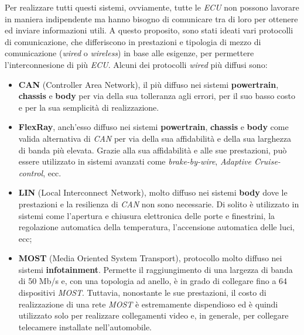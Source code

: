 Per realizzare tutti questi sistemi, ovviamente, tutte le \emph{ECU} non possono lavorare in maniera indipendente ma hanno bisogno di comunicare tra di loro per ottenere ed inviare informazioni utili. A questo proposito, sono stati ideati vari protocolli di comunicazione, che differiscono in prestazioni e tipologia di mezzo di comunicazione (\emph{wired} o \emph{wireless}) in base alle esigenze, per permettere l'interconnesione di più \emph{ECU}. Alcuni dei protocolli \emph{wired} più diffusi sono:
\begin{itemize}
    \item \textbf{CAN} (Controller Area Network), il più diffuso nei sistemi \textbf{powertrain}, \textbf{chassis} e \textbf{body} per via della sua tolleranza agli errori, per il suo basso costo e per la sua semplicità di realizzazione.
    \item \textbf{FlexRay}, anch'esso diffuso nei sistemi \textbf{powertrain}, \textbf{chassis} e \textbf{body} come valida alternativa di \emph{CAN} per via della sua affidabilità e della sua larghezza di banda più elevata. Grazie alla sua affidabilità e alle sue prestazioni, può essere utilizzato in sistemi avanzati come \emph{brake-by-wire}, \emph{Adaptive Cruise-control}, ecc. 
    \item \textbf{LIN} (Local Interconnect Network), molto diffuso nei sistemi \textbf{body} dove le prestazioni e la resilienza di \emph{CAN} non sono necessarie. Di solito è utilizzato in sistemi come l'apertura e chiusura elettronica delle porte e finestrini, la regolazione automatica della temperatura, l'accensione automatica delle luci, ecc; \cite{vinodhkumar_2014_automotive}
    \item \textbf{MOST} (Media Oriented System Transport), protocollo molto diffuso nei sistemi \textbf{infotainment}. Permette il raggiungimento di una largezza di banda di 50 Mb/s e, con una topologia ad anello, è in grado di collegare fino a 64 dispositivi \emph{MOST}. Tuttavia, nonostante le sue prestazioni, il costo di realizzazione di una rete \emph{MOST} è estremamente dispendioso ed è quindi utilizzato solo per realizzare collegamenti video e, in generale, per collegare telecamere installate nell'automobile. \cite{huang_2019_invehicle}
\end{itemize}


